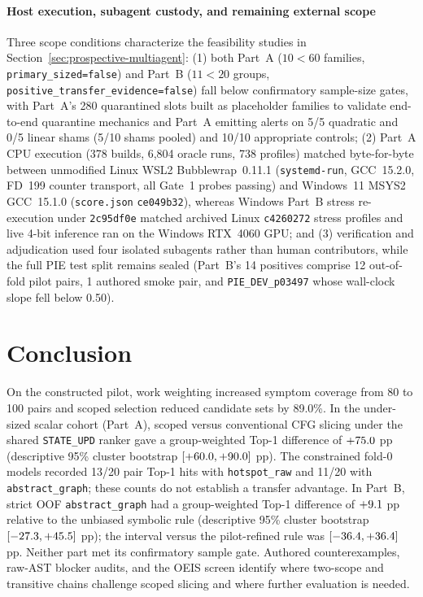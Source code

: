 \documentclass[10pt,journal]{IEEEtran}
\begin{document}
\paragraph{Host execution, subagent custody, and remaining external scope}
Three scope conditions characterize the feasibility studies in Section~\ref{sec:prospective-multiagent}: (1) both Part~A ($10 < 60$ families, \texttt{primary\_sized=false}) and Part~B ($11 < 20$ groups, \texttt{positive\_transfer\_evidence=false}) fall below confirmatory sample-size gates, with Part~A's 280 quarantined slots built as placeholder families to validate end-to-end quarantine mechanics and Part~A emitting alerts on 5/5 quadratic and 0/5 linear shams (5/10 shams pooled) and 10/10 appropriate controls; (2) Part~A CPU execution (378 builds, 6,804 oracle runs, 738 profiles) matched byte-for-byte between unmodified Linux WSL2 Bubblewrap~0.11.1 (\nolinkurl{systemd-run}, GCC~15.2.0, FD~199 counter transport, all Gate~1 probes passing) and Windows~11 MSYS2 GCC~15.1.0 (\nolinkurl{score.json} \texttt{ce049b32}), whereas Windows Part~B stress re-execution under \texttt{2c95df0e} matched archived Linux \texttt{c4260272} stress profiles and live 4-bit inference ran on the Windows RTX~4060 GPU; and (3) verification and adjudication used four isolated subagents rather than human contributors, while the full PIE test split remains sealed (Part~B's 14 positives comprise 12 out-of-fold pilot pairs, 1 authored smoke pair, and \texttt{PIE\_DEV\_p03497} whose wall-clock slope fell below 0.50).

\section{Conclusion}

On the constructed pilot, work weighting increased symptom coverage from 80 to 100 pairs and scoped selection reduced candidate sets by 89.0\%. In the under-sized scalar cohort (Part~A), scoped versus conventional CFG slicing under the shared \texttt{STATE\_UPD} ranker gave a group-weighted Top-1 difference of $+75.0$ pp (descriptive 95\% cluster bootstrap $[+60.0, +90.0]$ pp). The constrained fold-0 models recorded 13/20 pair Top-1 hits with \nolinkurl{hotspot_raw} and 11/20 with \nolinkurl{abstract_graph}; these counts do not establish a transfer advantage. In Part~B, strict OOF \nolinkurl{abstract_graph} had a group-weighted Top-1 difference of $+9.1$ pp relative to the unbiased symbolic rule (descriptive 95\% cluster bootstrap $[-27.3, +45.5]$ pp); the interval versus the pilot-refined rule was $[-36.4, +36.4]$ pp. Neither part met its confirmatory sample gate. Authored counterexamples, raw-AST blocker audits, and the OEIS screen identify where two-scope and transitive chains challenge scoped slicing and where further evaluation is needed.
\end{document}
